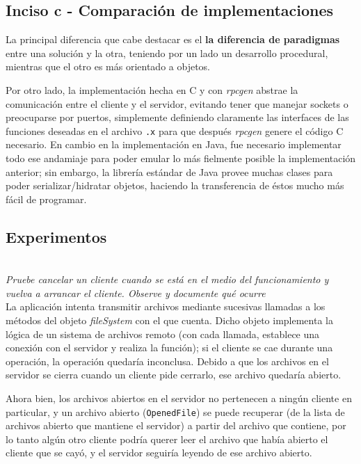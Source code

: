 \subsection{Inciso c - Comparación de implementaciones}

La principal diferencia que cabe destacar es el \textbf{la diferencia de paradigmas} entre una solución y la otra, teniendo por un lado un desarrollo procedural, mientras que el otro es más orientado a objetos.  

Por otro lado, la implementación hecha en C y con \emph{rpcgen} abstrae la comunicación entre el cliente y el servidor, evitando tener que manejar sockets o preocuparse por puertos, simplemente definiendo claramente las interfaces de las funciones deseadas en el archivo \texttt{.x} para que después \emph{rpcgen} genere el código C necesario. En cambio en la implementación en Java, fue necesario implementar todo ese andamiaje para poder emular lo más fielmente posible la implementación anterior; sin embargo, la librería estándar de Java provee muchas clases para poder serializar/hidratar objetos, haciendo la transferencia de éstos mucho más fácil de programar.

\subsection{Experimentos}

~\\
\emph{Pruebe cancelar un cliente cuando se está en el medio del funcionamiento y vuelva a arrancar el cliente. Observe y documente qué ocurre} 
~\\

La aplicación intenta transmitir archivos mediante sucesivas llamadas a los métodos del objeto \emph{fileSystem} con el que cuenta. Dicho objeto implementa la lógica de un sistema de archivos remoto (con cada llamada, establece una conexión con el servidor y realiza la función); si el cliente se cae durante una operación, la operación quedaría inconclusa. Debido a que los archivos en el servidor se cierra cuando un cliente pide cerrarlo, ese archivo quedaría abierto. 

Ahora bien, los archivos abiertos en el servidor no pertenecen a ningún cliente en particular, y un archivo abierto (\texttt{OpenedFile}) se puede recuperar (de la lista de archivos abierto que mantiene el servidor) a partir del archivo que contiene, por lo tanto algún otro cliente podría querer leer el archivo que había abierto el cliente que se cayó, y el servidor seguiría leyendo de ese archivo abierto.

